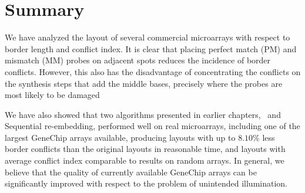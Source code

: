 \section{Summary}
\label{sec:affy_summary}

We have analyzed the layout of several commercial microarrays with respect to
border length and conflict index. It is clear that placing perfect match (PM)
and mismatch (MM) probes on adjacent spots reduces the incidence of border
conflicts. However, this also has the disadvantage of concentrating the
conflicts on the synthesis steps that add the middle bases, precisely where the
probes are most likely to be damaged

We have also showed that two algorithms presented in earlier chapters,
\Greedyplus\ and Sequential re-embedding, performed well on real microarrays,
including one of the largest GeneChip arrays available, producing layouts with
up to $8.10\%$ less border conflicts than the original layouts in reasonable
time, and layouts with average conflict index comparable to results on random
arrays. In general, we believe that the quality of currently available GeneChip
arrays can be significantly improved with respect to the problem of unintended
illumination.
